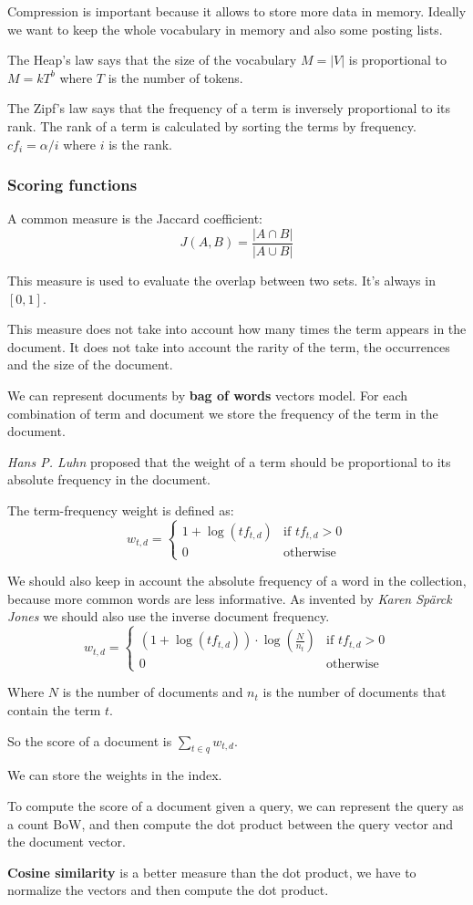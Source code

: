 Compression is important because it allows to store more data in memory.
Ideally we want to keep the whole vocabulary in memory and also some posting lists.

The Heap's law says that the size of the vocabulary $M=|V|$ is proportional to
$M=kT^b$ where $T$ is the number of tokens.

The Zipf's law says that the frequency of a term is inversely proportional to its rank.
The rank of a term is calculated by sorting the terms by frequency. $cf_i=\alpha/i$ where
$i$ is the rank.

\subsubsection{Scoring functions}
\label{sec:scoring_functions}

A common measure is the Jaccard coefficient:
\[
    J(A,B) = \frac{|A\cap B|}{|A\cup B|}
\]

This measure is used to evaluate the overlap between two sets.
It's always in $[0,1]$.

This measure does not take into account 
how many times the term appears in the document.
It does not take into account the rarity of the term, 
the occurrences and the size of the document.

We can represent documents by \textbf{bag of words} vectors model.
For each combination of term and document we store the frequency of the term in the document.

\textit{Hans P. Luhn} proposed that the weight of a term should be proportional to
its absolute frequency in the document.

The term-frequency weight is defined as:
\[
    w_{t,d} = 
    \begin{cases} 
        1 + \log(tf_{t,d}) & \text{if } tf_{t,d} > 0\\
        0 & \text{otherwise}
    \end{cases}
\]

We should also keep in account the absolute frequency of a word in the collection, because
more common words are less informative.
As invented by \textit{Karen Sp\"arck Jones} we should also use the inverse document frequency.
\[
    w_{t,d} = 
    \begin{cases}
    (1 + \log(tf_{t,d})) \cdot \log\left(\frac{N}{n_t}\right) & \text{if } tf_{t,d} > 0\\
    0 & \text{otherwise}
    \end{cases}
\]

Where $N$ is the number of documents and $n_t$ is the number of
documents that contain the term $t$.

So the score of a document is $\sum_{t\in q} w_{t,d}$.

We can store the weights in the index.

To compute the score of a document given a query, we can represent
the query as a count BoW, and then compute the dot product between
the query vector and the document vector.

\textbf{Cosine similarity} is a better measure than the dot product, we have to
normalize the vectors and then compute the dot product.
